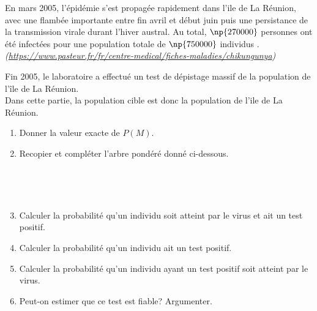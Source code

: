 \og En mars 2005, l'épidémie s'est propagée rapidement dans l'ile de La Réunion, avec une flambée importante entre fin avril et début juin puis une persistance de la transmission virale durant l'hiver austral. Au total, $\np{270000}$ personnes ont été infectées pour une population totale de $\np{750000}$ individus \fg{}.\\
\emph{(\href{https://www.pasteur.fr/fr/centre-medical/fiches-maladies/chikungunya}{https://www.pasteur.fr/fr/centre-medical/fiches-maladies/chikungunya})}

Fin 2005, le laboratoire a effectué un test de dépistage massif de la population de l'île de La Réunion.\\
 Dans cette partie, la population cible est donc la population de l'ile de La Réunion.


\begin{enumerate}[resume]
\item Donner la valeur exacte de $P(M)$.
\item  Recopier et compléter l'arbre pondéré donné ci-dessous. 

\hfill~
 \hfill~

\item Calculer la probabilité qu'un individu soit atteint par le virus et ait un test positif.
\item  Calculer la probabilité qu'un individu ait un test positif.
\item  Calculer la probabilité qu'un individu ayant un test positif soit atteint par le virus.
\item  Peut-on estimer que ce test est fiable? Argumenter.
\end{enumerate}

